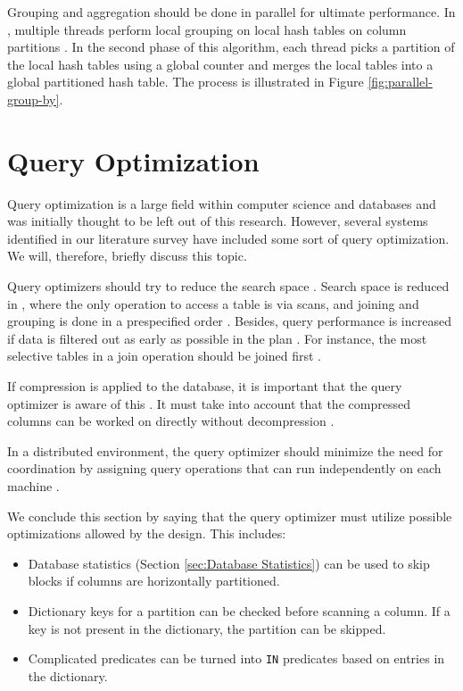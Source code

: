 Grouping and aggregation should be done in parallel for ultimate performance. In \ibm, multiple threads perform local grouping on local hash tables on column partitions \cite{Raman2013-em}. In the second phase of this algorithm, each thread picks a partition of the local hash tables using a global counter and merges the local tables into a global partitioned hash table. The process is illustrated in Figure \ref{fig:parallel-group-by}.


\section{Query Optimization}
\label{sec:Query Optimization}
Query optimization is a large field within computer science and databases and was initially thought to be left out of this research. However, several systems identified in our literature survey have included some sort of query optimization. We will, therefore, briefly discuss this topic. 

Query optimizers should try to reduce the search space \cite{Boncz2002-yj, Stonebraker2005-qz}. Search space is reduced in \blink, where the only operation to access a table is via scans, and joining and grouping is done in a prespecified order \cite{Barber2012-xt}. Besides, query performance is increased if data is filtered out as early as possible in the plan \cite{Lamb2012-kg}. For instance, the most selective tables in a join operation should be joined first \cite{Holloway2008-rr}.

If compression is applied to the database, it is important that the query optimizer is aware of this \cite{Westmann2000-mz}. It must take into account that the compressed columns can be worked on directly without decompression \cite{Stonebraker2005-qz}.

In a distributed environment, the query optimizer should minimize the need for coordination by assigning query operations that can run independently on each machine \cite{Exasol2014-xh}. 

We conclude this section by saying that the query optimizer must utilize possible optimizations allowed by the design. This includes:
\begin{itemize}
  \item Database statistics (Section \ref{sec:Database Statistics}) can be used to skip blocks if columns are horizontally partitioned.
  \item Dictionary keys for a partition can be checked before scanning a column. If a key is not present in the dictionary, the partition can be skipped.
  \item Complicated predicates can be turned into \texttt{IN} predicates based on entries in the dictionary.
\end{itemize}

